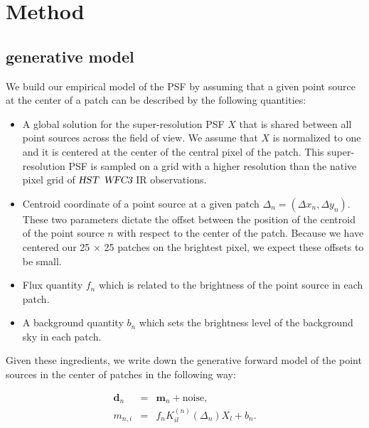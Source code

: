 \section{Method}\label{sec:hstmethod}

\subsection{generative model}

We build our empirical model of the PSF by assuming that a given point source at the center of a patch can be described by 
the following quantities: 

\begin{itemize}
\item A global solution for the super-resolution PSF $X$ that is shared between all point sources across the field of view. We assume 
that $X$ is normalized to one and it is centered at the center of the central pixel of the patch. This super-resolution PSF is sampled on 
a grid with a higher resolution than the native pixel grid of ${\textsl{HST}}$ ${\textsl{WFC3}}$ IR observations.

\item Centroid coordinate of a point source at a given patch $\Delta_n = (\Delta x_n, \Delta y_n)$. 
These two parameters dictate the offset between the position of the centroid of the point source $n$ with 
respect to the center of the patch. Because we have centered our 25 $\times$ 25 patches on the brightest pixel, we expect these offsets to be small.

\item Flux quantity $f_n$ which is related to the brightness of the point source in each patch.

\item A background quantity $b_n$ which sets the brightness level of the background sky in each patch.

\end{itemize}

Given these ingredients, we write down the generative forward model of the point sources in the center of patches in the following way:

\begin{eqnarray} \mathbf{d}_{n} &=& \mathbf{m}_{n} + \mathrm{noise}, \label{eq:model1} \\
       m_{n,i} &=& f_{n}K^{(n)}_{il} (\Delta_n) X_{l} + b_{n}. 
\label{eq:model}
\end{eqnarray} 


